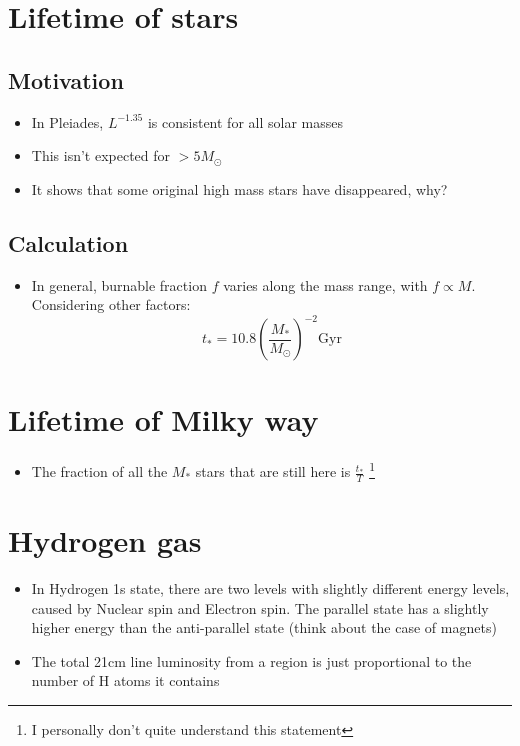 \documentclass{article}
\begin{document}
\section{Lifetime of stars}
\subsection{Motivation}
\begin{itemize}
\item In Pleiades, $L^{-1.35}$ is consistent for all solar masses
\item This isn't expected for $> 5 M_\odot$
\item It shows that some original high mass stars have disappeared, why?
\end{itemize}
\subsection{Calculation}
\begin{itemize}
\item In general, burnable fraction $f$ varies along the mass range, with $f \propto M$. Considering other factors:
\begin{equation}
t_*=10.8 \left(\frac{M_*}{M_\odot} \right)^{-2} \text{Gyr}
\end{equation}
\end{itemize}
\section{Lifetime of Milky way}
\begin{itemize}
\item The fraction of all the $M_*$ stars that are still here is $\frac{t_*}{T}$ \footnote{I personally don't quite understand this statement}
\end{itemize}
\section{Hydrogen gas}
\begin{itemize}
\item In Hydrogen 1s state, there are two levels with slightly different energy levels, caused by Nuclear spin and Electron spin. The parallel state has a slightly higher energy than the anti-parallel state (think about the case of magnets)
\item The total 21cm line luminosity from a region is just proportional to the number of H atoms it contains 
\end{itemize}
\end{document}

